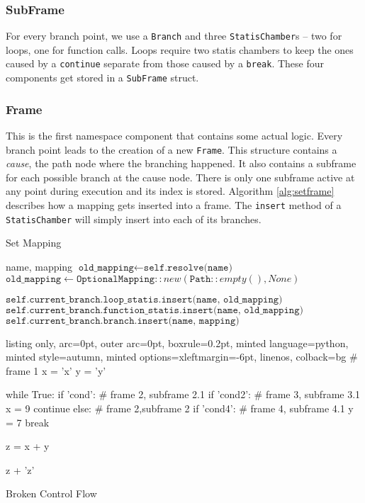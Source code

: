 \documentclass[a4paper, 16pt, oneside]{Thesis}
\begin{document}
\subsubsection{SubFrame}\label{subframe}

For every branch point, we use a \texttt{Branch} and three
\texttt{StatisChamber}s -- two for loops, one for function calls. Loops
require two statis chambers to keep the ones caused by a
\texttt{continue} separate from those caused by a \texttt{break}. These
four components get stored in a \texttt{SubFrame} struct.

\subsubsection{Frame}\label{frame}

This is the first namespace component that contains some actual logic.
Every branch point leads to the creation of a new \texttt{Frame}. This
structure contains a \emph{cause}, the path node where the branching
happened. It also contains a subframe for each possible branch at the
cause node. There is only one subframe active at any point during
execution and its index is stored. Algorithm \ref{alg:setframe}
describes how a mapping gets inserted into a frame. The \texttt{insert}
method of a \texttt{StatisChamber} will simply insert into each of its
branches.

\begin{algorithm}
    \caption{Set Mapping}\label{alg:setframe}
    \begin{algorithmic}[1]
         {name, mapping}
            \State $\texttt{old\_mapping} \gets \texttt{self.resolve(name)}$
          \Else
            \State $\texttt{old\_mapping} \gets \texttt{OptionalMapping}::new(\texttt{Path}::empty(), None)$
          \EndIf
        
          \State $\texttt{self.current\_branch.loop\_statis.insert(name, old\_mapping)}$
          \State $\texttt{self.current\_branch.function\_statis.insert(name, old\_mapping)}$
          \State $\texttt{self.current\_branch.branch.insert(name, mapping)}$
        \EndFunction
    \end{algorithmic}
\end{algorithm}

\begin{code}
  \begin{tcblisting}{listing only, 
  arc=0pt,
  outer arc=0pt, 
  boxrule=0.2pt,
  minted language=python,
  minted style=autumn,
  minted options={xleftmargin=-6pt, linenos},
  colback=bg}
# frame 1
x = 'x'
y = 'y'

while True:
    if 'cond': 
        # frame 2, subframe 2.1
        if 'cond2': 
            # frame 3, subframe 3.1
            x = 9
            continue
    else:
        # frame 2,subframe 2
        if 'cond4': 
            # frame 4, subframe 4.1
            y = 7
            break

    z = x + y

z + 'z'
\end{tcblisting}
\caption{Broken Control Flow} \label{smp:statis}
\end{code}
\end{document}
